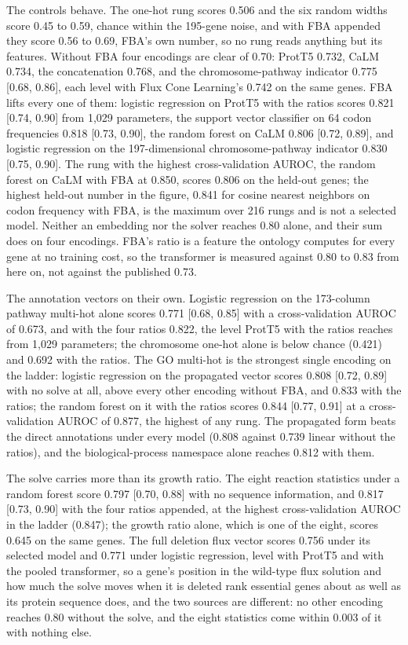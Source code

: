 

The controls behave. The one-hot rung scores 0.506 and the six random widths score 0.45
to 0.59, chance within the 195-gene noise, and with FBA appended they score 0.56 to 0.69,
FBA's own number, so no rung reads anything but its features. Without FBA four encodings
are clear of 0.70: ProtT5 0.732, CaLM 0.734, the
concatenation 0.768, and the chromosome-pathway indicator 0.775 [0.68, 0.86], each
level with Flux Cone Learning's 0.742 on the same genes. FBA lifts every one of them:
logistic regression on ProtT5 with the ratios scores 0.821 [0.74, 0.90] from 1,029
parameters, the support vector classifier on 64 codon frequencies 0.818 [0.73, 0.90], the
random forest on CaLM 0.806 [0.72, 0.89], and logistic regression on the 197-dimensional
chromosome-pathway indicator 0.830 [0.75, 0.90]. The rung with the highest
cross-validation AUROC, the random forest on CaLM with FBA at 0.850, scores 0.806 on the
held-out genes; the highest held-out number in the figure, 0.841 for cosine nearest
neighbors on codon frequency with FBA, is the maximum over 216 rungs and is not a
selected model. Neither an embedding nor the solver reaches 0.80 alone, and their sum
does on four encodings. FBA's ratio is a feature the ontology computes for every gene at
no training cost, so the transformer is measured against 0.80 to 0.83 from here on, not
against the published 0.73.

The annotation vectors on their own. Logistic regression on the 173-column pathway
multi-hot alone scores 0.771 [0.68, 0.85] with a cross-validation AUROC of 0.673, and
with the four ratios 0.822, the level ProtT5 with the ratios reaches from 1,029
parameters; the chromosome one-hot alone is below chance (0.421) and 0.692 with the
ratios. The GO multi-hot is the strongest single encoding on the ladder: logistic
regression on the propagated vector scores 0.808 [0.72, 0.89] with no solve at all,
above every other encoding without FBA, and 0.833 with the ratios; the random forest on
it with the ratios scores 0.844 [0.77, 0.91] at a cross-validation AUROC of 0.877, the
highest of any rung. The propagated form beats the direct annotations under every model
(0.808 against 0.739 linear without the ratios), and the biological-process namespace
alone reaches 0.812 with them.

The solve carries more than its growth ratio. The eight reaction statistics under a
random forest score 0.797 [0.70, 0.88] with no sequence information, and 0.817
[0.73, 0.90] with the four ratios appended, at the highest cross-validation AUROC in the
ladder (0.847); the growth ratio alone, which is one of the eight, scores 0.645 on the
same genes. The full deletion flux vector scores 0.756 under its selected model and
0.771 under logistic regression, level with ProtT5 and with the pooled transformer, so a
gene's position in the wild-type flux solution and how much the solve moves when it is
deleted rank essential genes about as well as its protein sequence does, and the two
sources are different: no other encoding reaches 0.80 without the solve, and the eight
statistics come within 0.003 of it with nothing else.

